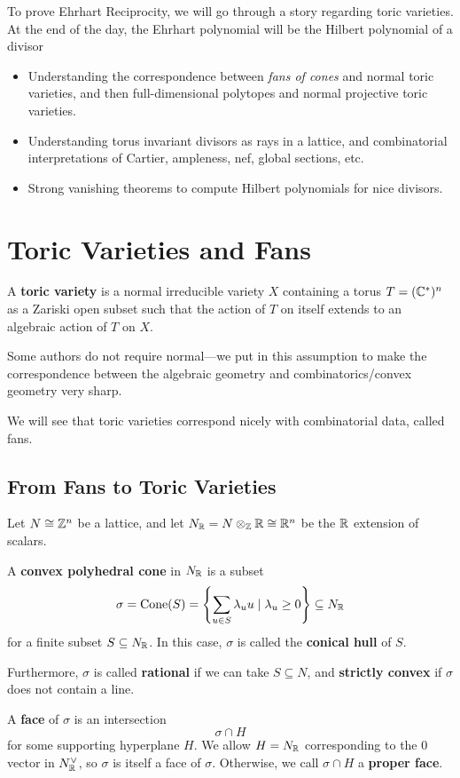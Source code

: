 \documentclass[12pt]{article}
\DeclareMathOperator{\Cone}{Cone}
\begin{document}
To prove Ehrhart Reciprocity, we will go through a story regarding toric varieties. At the end of the day, the Ehrhart polynomial will be the Hilbert polynomial of a divisor
\begin{itemize}
    \item Understanding the correspondence between \textit{fans of cones} and normal toric varieties, and then full-dimensional polytopes and normal projective toric varieties.
    \item Understanding torus invariant divisors as rays in a lattice, and combinatorial interpretations of Cartier, ampleness, nef, global sections, etc.
    \item Strong vanishing theorems to compute Hilbert polynomials for nice divisors.
\end{itemize}

\section{Toric Varieties and Fans}

\begin{defn}
    A \textbf{toric variety} is a normal irreducible variety $X$ containing a torus $T=(\mathbb{C}^*)^n$ as a Zariski open subset such that the action of $T$ on itself extends to an algebraic action of $T$ on $X$.
\end{defn}

Some authors do not require normal---we put in this assumption to make the correspondence between the algebraic geometry and combinatorics/convex geometry very sharp.

We will see that toric varieties correspond nicely with combinatorial data, called fans.

\subsection{From Fans to Toric Varieties}

Let $N\cong \mathbb{Z}^n$ be a lattice, and let $N_{\mathbb{R}} = N\otimes_{\mathbb{Z}} \mathbb{R} \cong \mathbb{R}^n$ be the $\mathbb{R}$ extension of scalars.

\begin{defn}
    A \textbf{convex polyhedral cone} in $N_{\mathbb{R}}$ is a subset
    \[\sigma = \Cone(S) = \left\{\sum_{u\in S} \lambda_u u \mid \lambda_u \geq 0\right\} \subseteq N_\R\]
    for a finite subset $S\subseteq N_{\mathbb{R}}$. In this case, $\sigma$ is called the \textbf{conical hull} of $S$.

    Furthermore, $\sigma$ is called \textbf{rational} if we can take $S\subseteq N$, and \textbf{strictly convex} if $\sigma$ does not contain a line.

    A \textbf{face} of $\sigma$ is an intersection
    \[\sigma \cap H\]
    for some supporting hyperplane $H$. We allow $H=N_{\mathbb{R}}$ corresponding to the $0$ vector in $N_{\mathbb{R}}^\vee$, so $\sigma$ is itself a face of $\sigma$. Otherwise, we call $\sigma\cap H$ a \textbf{proper face}.
\end{defn}
\end{document}
